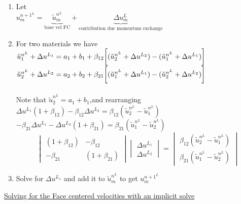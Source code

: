 \documentclass[fleqn]{article}
\newcommand{\B}[1]      {\biggr{#1}}
\begin{document}
\begin{enumerate}
\item Let \\
$u^{n+1^{L}}_m = \underbrace{\tilde u^{n^{L}}_m}_{\text{base vel FC}} 
+ \underbrace{\Delta{u^{L}_m}}_{\text{contribution due momentum exchange}}$
\item  For two materials we have\\
$
    \tilde u^{n^{L}}_1 + \Delta{u^{L_1}} = a_1 + b_1 + 
    \beta_{12}\B[(\tilde u^{n^{L}}_2 + \Delta{u^{L_2}}) - (\tilde u^{n^{L}}_1 + \Delta{u^{L_1}}) \B]
$\\
$
    \tilde u^{n^{L}}_2 + \Delta{u^{L_2}} = a_2 + b_2 + 
    \beta_{21}\B[(\tilde u^{n^{L}}_1 + \Delta{u^{L_1}}) - (\tilde u^{n^{L}}_2 + \Delta{u^{L_2}}) \B]
$\\
\\
Note that $\tilde u^{n^{L}}_2 = a_1 + b_1$,and rearranging\\
$
\Delta{u^{L_1}}(1 + \beta_{12}) - \beta_{12}\Delta{u^{L_2}} = \beta_{12}(\tilde u^{n^{L}}_2 - \tilde u^{n^{L}}_1)
$\\
$
-\beta_{21}\Delta{u^{L_1}} - \Delta{u^{L_2}}(1 + \beta_{21}) = \beta_{21}(\tilde u^{n^{L}}_1 - \tilde u^{n^{L}}_2)
$
\[ \begin{vmatrix} (1 + \beta_{12})  &  -\beta_{12} \\
                  -\beta_{21}       &  (1 + \beta_{21})
    \end{vmatrix}
    \begin{vmatrix} \Delta{u^{L_1}} \\
                    \Delta{u^{L_2}}
    \end{vmatrix}
    =
    \begin{vmatrix} \beta_{12}(\tilde u^{n^{L}}_2 - \tilde u^{n^{L}}_1) \\
                    \beta_{21}(\tilde u^{n^{L}}_1 - \tilde u^{n^{L}}_2)
    \end{vmatrix}                
\]
\item Solve for $\Delta{u^{L_1}}$ and add it to $\tilde u^{n^{L}}_m$ to get $u^{n+1^{L}}_m $
\end{enumerate}


\newpage
\underline{Solving for the Face centered velocities with an implicit solve}
\end{document}
